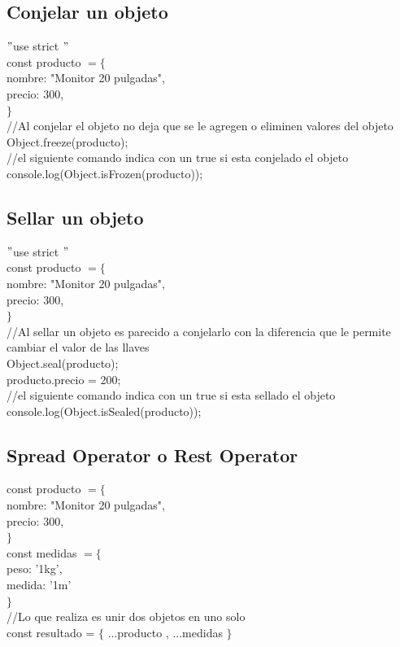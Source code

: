\documentclass[10pt,a4paper]{article}
\begin{document}
\subsection{Conjelar un objeto} 
$ " $use strict $ " $ \\
const producto  $ = \{ $  \\ nombre: "Monitor 20 pulgadas", \\ precio: 300, \\  $ \} $ \\ 
//Al conjelar el objeto no deja que se le agregen o eliminen valores del objeto \\
Object.freeze(producto);\\
//el siguiente comando indica con un true si esta conjelado el objeto\\
console.log(Object.isFrozen(producto));\\
\subsection{Sellar un objeto}
$ " $use strict $ " $ \\
const producto  $ = \{ $  \\ nombre: "Monitor 20 pulgadas", \\ precio: 300, \\  $ \} $ \\ 
//Al sellar un objeto es parecido a conjelarlo con la diferencia que le permite cambiar el valor de las llaves \\
Object.seal(producto);\\
producto.precio = 200; \\
//el siguiente comando indica con un true si esta sellado el objeto\\
console.log(Object.isSealed(producto));\\
\subsection{Spread Operator o Rest Operator}
const producto  $ = \{ $  \\ nombre: "Monitor 20 pulgadas", \\ precio: 300, \\  $ \} $ \\ 
const medidas $ = \{ $ \\ peso: '1kg', \\ medida: '1m' \\ $ \} $ \\
//Lo que realiza es unir dos objetos en uno solo \\
const resultado = $ \{ $ ...producto , ...medidas  $ \} $ \\
\end{document}
